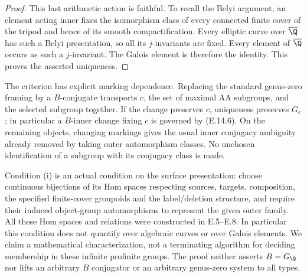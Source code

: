 \begin{proof}
This last arithmetic action is faithful. To recall
the Belyi argument, an element acting inner fixes the isomorphism class
of every connected finite cover of the tripod and hence of its smooth
compactification. Every elliptic curve over $\overline\Q$ has such
a Belyi presentation, so all its $j$-invariants are fixed. Every
element of $\overline\Q$ occurs as such a $j$-invariant. The Galois
element is therefore the identity. This proves the asserted uniqueness.
\end{proof}

The criterion has explicit marking dependence. Replacing the standard
genus-zero framing by a $B$-conjugate transports $c$, the set of
maximal AA subgroups, and the selected subgroup together. If the
change preserves $c$, uniqueness preserves $G_c$; in particular a
$B$-inner change fixing $c$ is governed by (E.14.6). On the remaining
objects, changing markings gives the usual inner conjugacy ambiguity
already removed by taking outer automorphism classes. No unchosen
identification of a subgroup with its conjugacy class is made.

Condition (i) is an actual condition on the surface presentation:
choose continuous bijections of its Hom spaces respecting sources,
targets, composition, the specified finite-cover groupoids and the
label/deletion structure, and require their induced object-group
automorphisms to represent the given outer family. All these Hom
spaces and relations were constructed in E.5--E.8. In particular this
condition does not quantify over algebraic curves or over Galois
elements. We claim a mathematical characterization, not a terminating
algorithm for deciding membership in these infinite profinite groups.
The proof neither asserts $B=G_\Q$ nor lifts an arbitrary $B$
conjugator or an arbitrary genus-zero system to all types.
